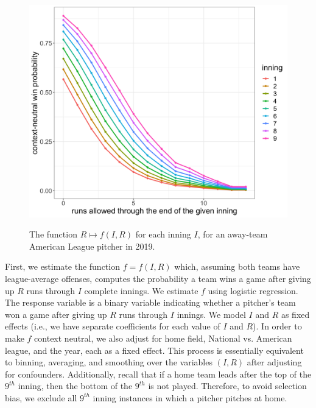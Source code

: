 \documentclass[12pt]{article}
\begin{document}
\begin{figure}[t!]
\centering
\caption{The function $R \mapsto f(I,R)$ for each inning $I$, for an away-team American League pitcher in 2019.} 
\includegraphics[width=15cm]{../writeup_plots/plot_fIR_R_smoothed.png}
\label{fig:fR}
\end{figure}

First, we estimate the function $f=f(I,R)$ which, assuming both teams have league-average offenses, computes the probability a team wins a game after giving up $R$ runs through $I$ complete innings. We estimate $f$ using logistic regression. The response variable is a binary variable indicating whether a pitcher's team won a game after giving up $R$ runs through $I$ innings. We model $I$ and $R$ as fixed effects (i.e., we have separate coefficients for each value of $I$ and $R$). In order to make $f$ context neutral, we also adjust for home field, National vs. American league, and the year, each as a fixed effect. This process is essentially equivalent to binning, averaging, and smoothing over the variables $(I,R)$ after adjusting for confounders. Additionally, recall that if a home team leads after the top of the $9^{th}$ inning, then the bottom of the $9^{th}$ is not played. Therefore, to avoid selection bias, we exclude all $9^{th}$ inning instances in which a pitcher pitches at home.

\end{document}
